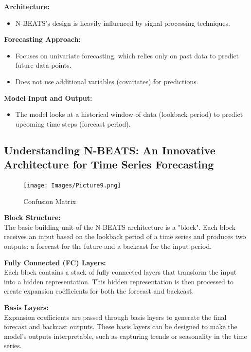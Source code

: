 \documentclass{article}
\begin{document}
\textbf{Architecture:} \\
\begin{itemize}
  \item N-BEATS's design is heavily influenced by signal processing techniques.
\end{itemize}

\textbf{Forecasting Approach:} \\
\begin{itemize}
  \item Focuses on univariate forecasting, which relies only on past data to predict future data points.
  \item Does not use additional variables (covariates) for predictions.
\end{itemize}

\textbf{Model Input and Output:} \\
\begin{itemize}
  \item The model looks at a historical window of data (lookback period) to predict upcoming time steps (forecast period).
\end{itemize}

\subsection{Understanding N-BEATS: An Innovative Architecture for Time Series Forecasting}

\begin{figure}
    \centering
    \texttt{[image: Images/Picture9.png]}
    \caption{Confusion Matrix}
    \label{fig:enter-labe}
\end{figure}

\textbf{Block Structure:} \\
The basic building unit of the N-BEATS architecture is a "block". Each block receives an input based on the lookback period of a time series and produces two outputs: a forecast for the future and a backcast for the input period.

\textbf{Fully Connected (FC) Layers:} \\
Each block contains a stack of fully connected layers that transform the input into a hidden representation. This hidden representation is then processed to create expansion coefficients for both the forecast and backcast.

\textbf{Basis Layers:} \\
Expansion coefficients are passed through basis layers to generate the final forecast and backcast outputs. These basis layers can be designed to make the model's outputs interpretable, such as capturing trends or seasonality in the time series.
\end{document}
